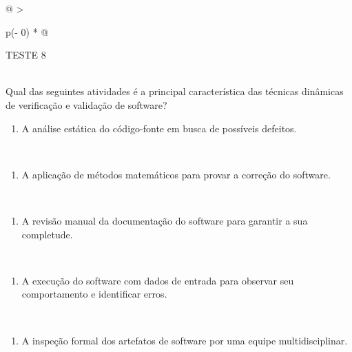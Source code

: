 \documentclass[
]{book}
\providecommand{\tightlist}{%
  \setlength{\itemsep}{0pt}\setlength{\parskip}{0pt}}
\begin{document}
\begin{longtable}[]{@{}
  >{\raggedright\arraybackslash}p{(\columnwidth - 0\tabcolsep) * }@{}}
\toprule\noalign{}
\begin{minipage}[b]{\linewidth}\raggedright
TESTE 8
\end{minipage} \\
\midrule\noalign{}
\endhead
\bottomrule\noalign{}
\endlastfoot
Qual das seguintes atividades é a principal característica das técnicas dinâmicas de verificação e validação de software? \\
\begin{minipage}[t]{\linewidth}\raggedright
\begin{enumerate}
\def\labelenumi{\Alph{enumi})}
\tightlist
\item
  A análise estática do código-fonte em busca de possíveis defeitos.
\end{enumerate}
\end{minipage} \\
\begin{minipage}[t]{\linewidth}\raggedright
\begin{enumerate}
\def\labelenumi{\Alph{enumi})}
\setcounter{enumi}{1}
\tightlist
\item
  A aplicação de métodos matemáticos para provar a correção do software.
\end{enumerate}
\end{minipage} \\
\begin{minipage}[t]{\linewidth}\raggedright
\begin{enumerate}
\def\labelenumi{\Alph{enumi})}
\setcounter{enumi}{2}
\tightlist
\item
  A revisão manual da documentação do software para garantir a sua completude.
\end{enumerate}
\end{minipage} \\
\begin{minipage}[t]{\linewidth}\raggedright
\begin{enumerate}
\def\labelenumi{\Alph{enumi})}
\setcounter{enumi}{3}
\tightlist
\item
  A execução do software com dados de entrada para observar seu comportamento e identificar erros.
\end{enumerate}
\end{minipage} \\
\begin{minipage}[t]{\linewidth}\raggedright
\begin{enumerate}
\def\labelenumi{\Alph{enumi})}
\setcounter{enumi}{4}
\tightlist
\item
  A inspeção formal dos artefatos de software por uma equipe multidisciplinar.
\end{enumerate}
\end{minipage} \\
\end{longtable}
\end{document}
